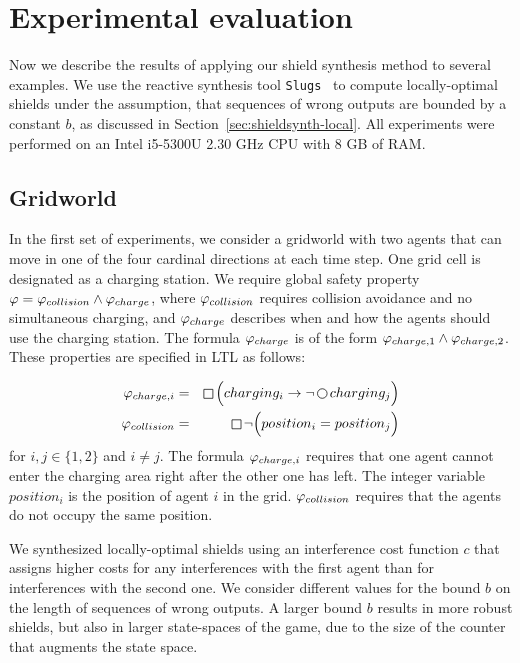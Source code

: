 \section{Experimental evaluation}
\label{sec_exp}

Now we describe the results of applying our shield synthesis method to several examples. We use the reactive synthesis tool \texttt{Slugs}~\cite{EhlersR16} to compute locally-optimal shields
under the assumption, that sequences of wrong outputs are bounded by a constant $b$, as discussed in Section~\ref{sec:shieldsynth-local}.
All experiments were  performed on an Intel i5-5300U 2.30 GHz CPU with 8 GB of RAM.

\subsection{Gridworld}\label{exp:gridworld}
In the first set of experiments, we consider a gridworld with two agents that can move in one of the four cardinal directions at each time step. One grid cell is designated as a charging station. We require global safety property $\varphi = \varphi_{collision} \wedge \varphi_{charge}$, where $\varphi_{collision}$ requires collision avoidance and no simultaneous charging, and $\varphi_{charge}$ describes when and how the agents should use the charging station.
  The formula $\varphi_{charge}$ is of the form $\varphi_{charge,1} \wedge \varphi_{charge,2}$. These properties are specified in LTL as follows:
  \vspace{-0.3cm}

  \begin{align}\label{eqn:safety2}
  \spec_{charge,i} &= &\LTLglobally\Big(charging_i \rightarrow \lnot \LTLnext charging_j				\Big) \nonumber \\
  \spec_{collision} &=&\LTLglobally \lnot \Big(position_i = position_j				\Big)
  \end{align}
  for $i,j \in \{1,2\}$ and $i \neq j$. The formula $\varphi_{charge,i}$ requires that one agent cannot enter the charging area right  after the other one has left. The integer variable $position_i$ is the position of agent $i$ in the grid. $\varphi_{collision}$ requires that the agents do not occupy the same position.

We synthesized locally-optimal shields using an interference cost function $c$ that assigns higher costs for any interferences with
the first agent than for interferences with the second one. We consider different values for the bound $b$ on the length of sequences of wrong outputs. A larger bound $b$ results in more robust shields, but also in larger state-spaces of the game, due to the size of the counter that augments the state space.

